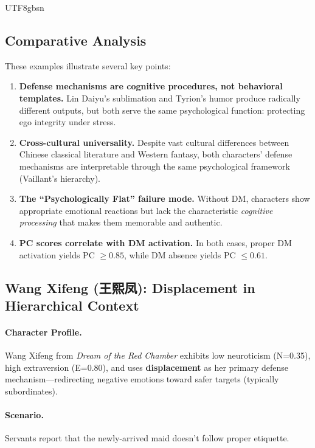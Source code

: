 \documentclass[11pt]{article}
\begin{document}
\begin{CJK*}{UTF8}{gbsn}
\subsection{Comparative Analysis}

These examples illustrate several key points:

\begin{enumerate}
    \item \textbf{Defense mechanisms are cognitive procedures, not behavioral templates.} Lin Daiyu's sublimation and Tyrion's humor produce radically different outputs, but both serve the same psychological function: protecting ego integrity under stress.
    
    \item \textbf{Cross-cultural universality.} Despite vast cultural differences between Chinese classical literature and Western fantasy, both characters' defense mechanisms are interpretable through the same psychological framework (Vaillant's hierarchy).
    
    \item \textbf{The ``Psychologically Flat'' failure mode.} Without DM, characters show appropriate emotional reactions but lack the characteristic \textit{cognitive processing} that makes them memorable and authentic.
    
    \item \textbf{PC scores correlate with DM activation.} In both cases, proper DM activation yields PC $\geq 0.85$, while DM absence yields PC $\leq 0.61$.
\end{enumerate}

\subsection{Wang Xifeng (王熙凤): Displacement in Hierarchical Context}

\paragraph{Character Profile.} Wang Xifeng from \textit{Dream of the Red Chamber} exhibits low neuroticism (N=0.35), high extraversion (E=0.80), and uses \textbf{displacement} as her primary defense mechanism---redirecting negative emotions toward safer targets (typically subordinates).

\paragraph{Scenario.} Servants report that the newly-arrived maid doesn't follow proper etiquette.


\end{CJK*}
\end{document}
